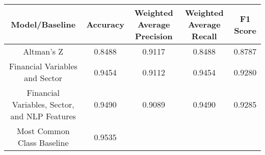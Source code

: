 \footnotesize
\begin{tabular}{ccccc}
\toprule
Model/Baseline & Accuracy & Weighted Average Precision & Weighted Average Recall & F1 Score \\
\midrule
Altman's Z & 0.8488 & 0.9117 & 0.8488 & 0.8787 \\
Financial Variables and Sector & 0.9454 & 0.9112 & 0.9454 & 0.9280 \\
Financial Variables, Sector, and NLP Features & 0.9490 & 0.9089 & 0.9490 & 0.9285 \\
Most Common Class Baseline & 0.9535 &  &  &  \\
\bottomrule
\end{tabular}

\normalsize